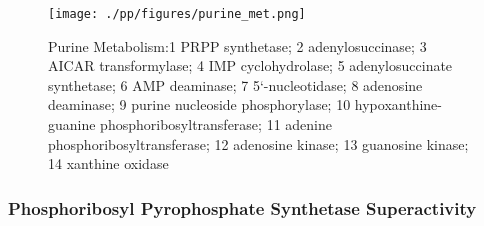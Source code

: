 \documentclass{scrartcl}
\begin{document}
\begin{figure}[htbp]
\centering
\texttt{[image: ./pp/figures/purine\_met.png]}
\caption{\label{fig:orgda0cff5}
Purine Metabolism:1 PRPP synthetase; 2 adenylosuccinase; 3 AICAR transformylase; 4 IMP cyclohydrolase; 5 adenylosuccinate synthetase; 6 AMP deaminase; 7 5‘-nucleotidase; 8 adenosine deaminase; 9 purine nucleoside phosphorylase; 10 hypoxanthine-guanine phosphoribosyltransferase; 11 adenine phosphoribosyltransferase; 12 adenosine kinase; 13 guanosine kinase; 14 xanthine oxidase}
\end{figure}

\subsubsection{Phosphoribosyl Pyrophosphate Synthetase Superactivity}
\label{sec:orgf33a605}
\end{document}
